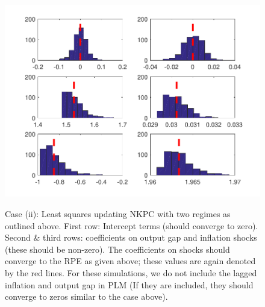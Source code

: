\documentclass[12pt,reqno]{article}
\numberwithin{equation}{section}
\begin{document}
\begin{figure}[H]
\caption{ Case (ii): Least squares updating NKPC with two regimes as outlined above.   First row: Intercept terms (should converge to zero). Second \& third rows: coefficients on output gap and inflation shocks (these should be non-zero). The coefficients on shocks should converge to the RPE as given above; these values are again denoted by the red lines. For these simulations, we do not include the lagged inflation and output gap in PLM (If they are included, they should converge to zeros similar to the case above). } 

\includegraphics[scale=0.6]{MC_MS_MSV_withoutLags.pdf}\\
\end{figure}
\end{document}
